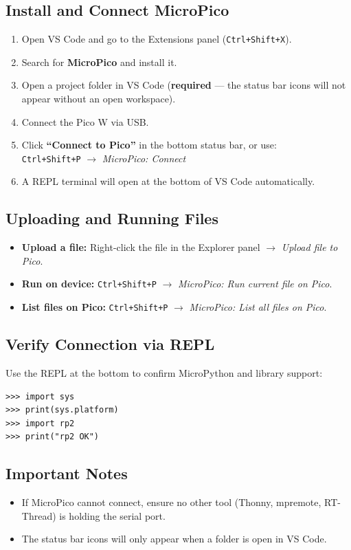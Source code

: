 \documentclass[11pt,a4paper]{article}
\begin{document}
\subsection{Install and Connect MicroPico}
\begin{enumerate}[leftmargin=*]
  \item Open VS Code and go to the Extensions panel (\texttt{Ctrl+Shift+X}).
  \item Search for \textbf{MicroPico} and install it.
  \item Open a project folder in VS Code (\textbf{required} — the status bar icons will not appear without an open workspace).
  \item Connect the Pico W via USB.
  \item Click \textbf{``Connect to Pico''} in the bottom status bar, or use:\\
    \texttt{Ctrl+Shift+P} $\rightarrow$ \textit{MicroPico: Connect}
  \item A REPL terminal will open at the bottom of VS Code automatically.
\end{enumerate}

\subsection{Uploading and Running Files}
\begin{itemize}
  \item \textbf{Upload a file:} Right-click the file in the Explorer panel $\rightarrow$ \textit{Upload file to Pico}.
  \item \textbf{Run on device:} \texttt{Ctrl+Shift+P} $\rightarrow$ \textit{MicroPico: Run current file on Pico}.
  \item \textbf{List files on Pico:} \texttt{Ctrl+Shift+P} $\rightarrow$ \textit{MicroPico: List all files on Pico}.
\end{itemize}

\subsection{Verify Connection via REPL}
Use the REPL at the bottom to confirm MicroPython and library support:
\begin{verbatim}
>>> import sys
>>> print(sys.platform)
>>> import rp2
>>> print("rp2 OK")
\end{verbatim}

\subsection{Important Notes}
\begin{itemize}
  \item If MicroPico cannot connect, ensure no other tool (Thonny, mpremote, RT-Thread) is holding the serial port.
  \item The status bar icons will only appear when a folder is open in VS Code.
\end{itemize}
\end{document}
